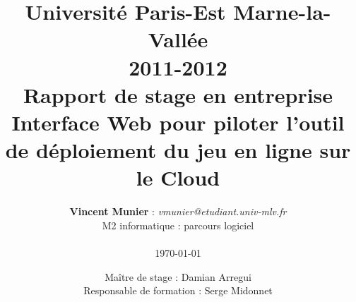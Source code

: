 \documentclass[20pt, a4paper]{report}
\title
    {   \vspace{-55mm}
      \normalsize{Université Paris-Est Marne-la-Vallée\\
        2011-2012}\\
      \vspace{70mm} 
      \Huge{\textbf{Rapport de stage en entreprise}}\\
      \huge{Interface Web pour piloter l'outil de déploiement du jeu en ligne
        sur le Cloud}\\
    }
\author{\textbf{Vincent Munier} : \textit{vmunier@etudiant.univ-mlv.fr} \\
      M2 informatique : parcours logiciel\\
      \vspace{25mm} \\
      \today
    }
\date{
      \normalsize{
        \vspace{40mm}
        Maître de stage : Damian Arregui\\
        Responsable de formation : Serge Midonnet\\
      }
    }
\begin{document}
    \maketitle

    \renewcommand{\abstractname}{Sujet de stage}

    \clearpage
    \tableofcontents
    \clearpage

    \begin{onehalfspace}           %

      
      
      
      
      
      
      
      

    \end{onehalfspace}             %

    
\end{document}
